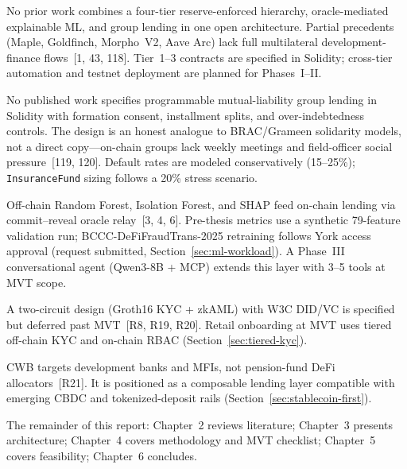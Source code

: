 \documentclass[12pt,a4paper]{report}
\begin{document}
\begin{description}[leftmargin=0pt]

\item[\textbf{Contribution 1 --- Four-Tier Hierarchical DeFi.}]
No prior work combines a four-tier reserve-enforced hierarchy, oracle-mediated explainable ML, and group lending in one open architecture. Partial precedents (Maple, Goldfinch, Morpho~V2, Aave Arc) lack full multilateral development-finance flows~[1, 43, 118]. Tier~1--3 contracts are specified in Solidity; cross-tier automation and testnet deployment are planned for Phases~I--II.

\item[\textbf{Contribution 2 --- On-Chain Group Lending.}]
No published work specifies programmable mutual-liability group lending in Solidity with formation consent, installment splits, and over-indebtedness controls. The design is an honest analogue to BRAC/Grameen solidarity models, not a direct copy---on-chain groups lack weekly meetings and field-officer social pressure~[119, 120]. Default rates are modeled conservatively (15--25\%); \texttt{InsuranceFund} sizing follows a 20\% stress scenario.

\item[\textbf{Contribution 3 --- Oracle-Mediated ML with Explainability.}]
Off-chain Random Forest, Isolation Forest, and SHAP feed on-chain lending via commit--reveal oracle relay~[3, 4, 6]. Pre-thesis metrics use a synthetic 79-feature validation run; BCCC-DeFiFraudTrans-2025 retraining follows York access approval (request submitted, Section~\ref{sec:ml-workload}). A Phase~III conversational agent (Qwen3-8B + MCP) extends this layer with 3--5 tools at MVT scope.

\item[\textbf{Contribution 4 --- ZKP Compliance Pathway (Future Work).}]
A two-circuit design (Groth16 KYC + zkAML) with W3C DID/VC is specified but deferred past MVT~[R8, R19, R20]. Retail onboarding at MVT uses tiered off-chain KYC and on-chain RBAC (Section~\ref{sec:tiered-kyc}).

\end{description}

CWB targets development banks and MFIs, not pension-fund DeFi allocators~[R21]. It is positioned as a composable lending layer compatible with emerging CBDC and tokenized-deposit rails (Section~\ref{sec:stablecoin-first}).

The remainder of this report: Chapter~2 reviews literature; Chapter~3 presents architecture; Chapter~4 covers methodology and MVT checklist; Chapter~5 covers feasibility; Chapter~6 concludes.
\end{document}
